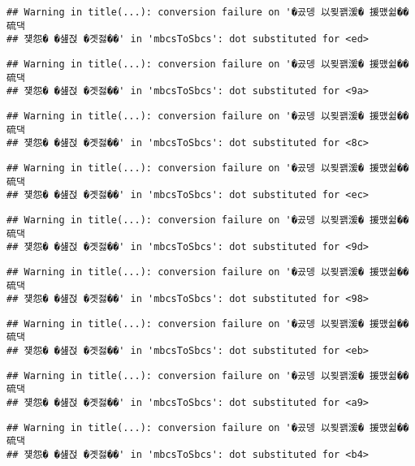 \documentclass[
]{article}
\begin{document}
\begin{verbatim}
## Warning in title(...): conversion failure on '�곴뎅 以묒꽭湲� 援먰쉶�� 硫댁
## 쟻怨� �섎젅 �곗젏��' in 'mbcsToSbcs': dot substituted for <ed>
\end{verbatim}

\begin{verbatim}
## Warning in title(...): conversion failure on '�곴뎅 以묒꽭湲� 援먰쉶�� 硫댁
## 쟻怨� �섎젅 �곗젏��' in 'mbcsToSbcs': dot substituted for <9a>
\end{verbatim}

\begin{verbatim}
## Warning in title(...): conversion failure on '�곴뎅 以묒꽭湲� 援먰쉶�� 硫댁
## 쟻怨� �섎젅 �곗젏��' in 'mbcsToSbcs': dot substituted for <8c>
\end{verbatim}

\begin{verbatim}
## Warning in title(...): conversion failure on '�곴뎅 以묒꽭湲� 援먰쉶�� 硫댁
## 쟻怨� �섎젅 �곗젏��' in 'mbcsToSbcs': dot substituted for <ec>
\end{verbatim}

\begin{verbatim}
## Warning in title(...): conversion failure on '�곴뎅 以묒꽭湲� 援먰쉶�� 硫댁
## 쟻怨� �섎젅 �곗젏��' in 'mbcsToSbcs': dot substituted for <9d>
\end{verbatim}

\begin{verbatim}
## Warning in title(...): conversion failure on '�곴뎅 以묒꽭湲� 援먰쉶�� 硫댁
## 쟻怨� �섎젅 �곗젏��' in 'mbcsToSbcs': dot substituted for <98>
\end{verbatim}

\begin{verbatim}
## Warning in title(...): conversion failure on '�곴뎅 以묒꽭湲� 援먰쉶�� 硫댁
## 쟻怨� �섎젅 �곗젏��' in 'mbcsToSbcs': dot substituted for <eb>
\end{verbatim}

\begin{verbatim}
## Warning in title(...): conversion failure on '�곴뎅 以묒꽭湲� 援먰쉶�� 硫댁
## 쟻怨� �섎젅 �곗젏��' in 'mbcsToSbcs': dot substituted for <a9>
\end{verbatim}

\begin{verbatim}
## Warning in title(...): conversion failure on '�곴뎅 以묒꽭湲� 援먰쉶�� 硫댁
## 쟻怨� �섎젅 �곗젏��' in 'mbcsToSbcs': dot substituted for <b4>
\end{verbatim}
\end{document}

